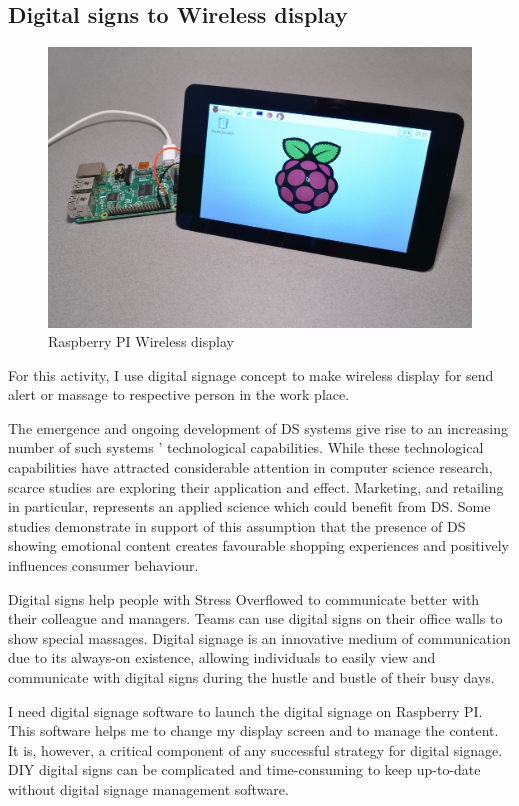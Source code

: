 \subsection{Digital signs to Wireless display}
\begin{figure}[hbt!] 
  \centering
  \includegraphics[width=0.5\linewidth]{chap4/image4/dipl.jpg}
  \caption[Raspberry PI Wireless display ]{Raspberry PI Wireless display}
  \label{fig:PI_disp}
\end{figure}
For this activity, I use digital signage concept to make wireless display for send alert or massage to respective person in the work place.

The emergence and ongoing development of \acf{DS} systems give rise to an increasing number of such systems ' technological capabilities. While these technological capabilities have attracted considerable attention in computer science research, scarce studies are exploring their application and effect.  Marketing, and retailing in particular, represents an applied science which could benefit from \acf{DS}.  Some studies demonstrate in support of this assumption that the presence of \acs{DS} showing emotional content creates favourable shopping experiences and positively influences consumer behaviour.\citep{Bauer2018ResearchRetail}

Digital signs help people with Stress Overflowed to communicate better with their colleague and managers. Teams can use digital signs on their office walls to show special massages. Digital signage is an innovative medium of communication due to its always-on existence, allowing individuals to easily view and communicate with digital signs during the hustle and bustle of their busy days.

I need digital signage software to launch the digital signage on Raspberry PI. This software helps me to change my display screen and to manage the content. It is, however, a critical component of any successful strategy for digital signage. \acs{DIY} digital signs can be complicated and time-consuming to keep up-to-date without digital signage management software.

